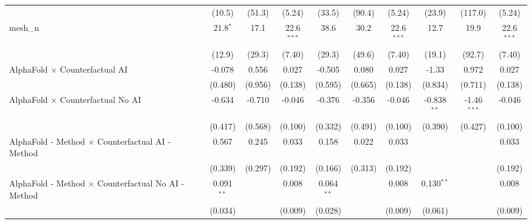 \begin{tabular}{lccccccccc}
                                                               & (10.5)         & (51.3)         & (5.24)        & (33.5)         & (90.4)         & (5.24)        & (23.9)         & (117.0)        & (5.24)\\   
   mesh\_n                                                     & 21.8$^{*}$     & 17.1           & 22.6$^{***}$  & 38.6           & 30.2           & 22.6$^{***}$  & 12.7           & 19.9           & 22.6$^{***}$\\   
                                                               & (12.9)         & (29.3)         & (7.40)        & (29.3)         & (49.6)         & (7.40)        & (19.1)         & (92.7)         & (7.40)\\   
   AlphaFold $\times$ Counterfactual AI                        & -0.078         & 0.556          & 0.027         & -0.505         & 0.080          & 0.027         & -1.33          & 0.972          & 0.027\\   
                                                               & (0.480)        & (0.956)        & (0.138)       & (0.595)        & (0.665)        & (0.138)       & (0.834)        & (0.711)        & (0.138)\\   
   AlphaFold $\times$ Counterfactual No AI                     & -0.634         & -0.710         & -0.046        & -0.376         & -0.356         & -0.046        & -0.838$^{**}$  & -1.46$^{***}$  & -0.046\\   
                                                               & (0.417)        & (0.568)        & (0.100)       & (0.332)        & (0.491)        & (0.100)       & (0.390)        & (0.427)        & (0.100)\\   
   AlphaFold - Method $\times$ Counterfactual AI - Method      & 0.567          & 0.245          & 0.033         & 0.158          & 0.022          & 0.033         &                &                & 0.033\\   
                                                               & (0.339)        & (0.297)        & (0.192)       & (0.166)        & (0.313)        & (0.192)       &                &                & (0.192)\\   
   AlphaFold - Method $\times$ Counterfactual No AI - Method   & 0.091$^{**}$   &                & 0.008         & 0.064$^{**}$   &                & 0.008         & 0.130$^{**}$   &                & 0.008\\   
                                                               & (0.034)        &                & (0.009)       & (0.028)        &                & (0.009)       & (0.061)        &                & (0.009)\\   

\end{tabular}
